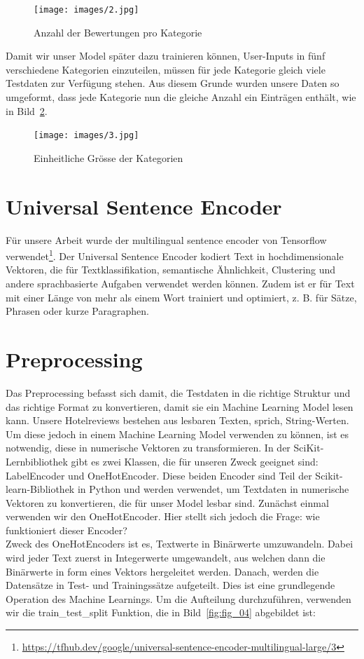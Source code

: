 \begin{figure}[H]
\centering
\texttt{[image: images/2.jpg]}
\caption{Anzahl der Bewertungen pro Kategorie}
\label{fig:fig_02}
\end{figure}
\FloatBarrier
\newpage
Damit wir unser Model später dazu trainieren können, User-Inputs in fünf verschiedene Kategorien einzuteilen, müssen für jede Kategorie gleich viele Testdaten zur Verfügung stehen. Aus diesem Grunde wurden unsere Daten so umgeformt, dass jede Kategorie nun die gleiche Anzahl ein Einträgen enthält, wie in Bild~\ref{fig:fig_03}.

\begin{figure}[H]
\centering
\texttt{[image: images/3.jpg]}
\caption{Einheitliche Grösse der Kategorien}
\label{fig:fig_03}
\end{figure}
\FloatBarrier

\section{Universal Sentence Encoder}	

Für unsere Arbeit wurde der multilingual sentence encoder von Tensorflow verwendet\footnote{ \url{https://tfhub.dev/google/universal-sentence-encoder-multilingual-large/3}}. Der Universal Sentence Encoder kodiert Text in hochdimensionale Vektoren, die für Textklassifikation, semantische Ähnlichkeit, Clustering und andere sprachbasierte Aufgaben verwendet werden können. Zudem ist er für Text mit einer Länge von mehr als einem Wort trainiert und optimiert, z. B. für Sätze, Phrasen oder kurze Paragraphen.

\newpage
\section{Preprocessing}
Das Preprocessing befasst sich damit, die Testdaten in die richtige Struktur und das richtige Format zu konvertieren, damit sie ein Machine Learning Model lesen kann.
Unsere Hotelreviews bestehen aus lesbaren Texten, sprich, String-Werten. Um diese jedoch in einem Machine Learning Model verwenden zu können, ist es notwendig, diese in numerische Vektoren zu transformieren.
In der SciKit-Lernbibliothek gibt es zwei Klassen, die für unseren Zweck geeignet sind: LabelEncoder und OneHotEncoder. Diese beiden Encoder sind Teil der \gls{Scikit-learn}-Bibliothek in Python und werden verwendet, um Textdaten in numerische Vektoren zu konvertieren, die für unser Model lesbar sind.
Zunächst einmal verwenden wir den OneHotEncoder. Hier stellt sich jedoch die Frage: wie funktioniert dieser Encoder?\\Zweck des OneHotEncoders ist es, Textwerte in Binärwerte umzuwandeln. Dabei wird jeder Text zuerst in Integerwerte umgewandelt, aus welchen dann die Binärwerte in form eines Vektors hergeleitet werden.
Danach, werden die Datensätze in Test- und Trainingssätze aufgeteilt. Dies ist eine grundlegende Operation des Machine Learnings.
Um die Aufteilung durchzuführen, verwenden wir die train\_test\_split Funktion, die in Bild~\ref{fig:fig_04} abgebildet ist:

